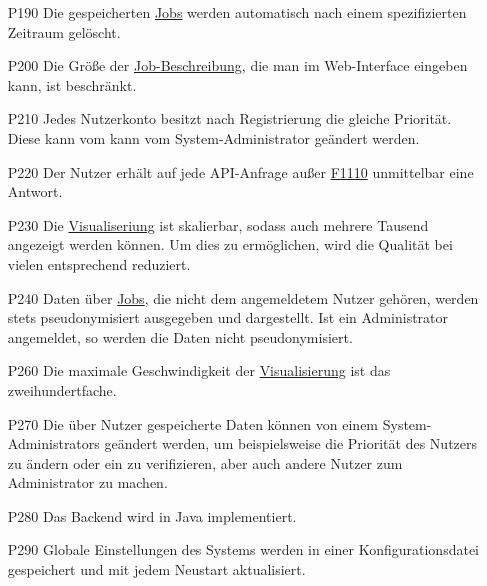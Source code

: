 \begin{itemize}[noitemsep]
    \item[P190] Die gespeicherten \hyperref[B:Jobs]{Jobs} werden automatisch nach einem spezifizierten Zeitraum gelöscht.

    \item[P200] Die Größe der \hyperref[B:Job-Beschreibung]{Job-Beschreibung}, die man im \gls{Web-Interface} eingeben kann, ist beschränkt.

    
    \item[P210] Jedes \gls{Nutzerkonto} besitzt nach Registrierung die gleiche Priorität. Diese kann vom kann vom \gls{System-Administrator} geändert werden.
    
    
    \item[P220] Der \gls{Nutzer} erhält auf jede \gls{API}-Anfrage außer \hyperref[FA:API:Andauernde Abfrage des Ergebnisses eines Jobs]{F1110} unmittelbar eine  Antwort.
    
    \item[P230] Die \hyperref[pages:visualization]{Visualiseriung} ist skalierbar, sodass auch mehrere Tausend  angezeigt werden können. Um dies zu ermöglichen, wird die Qualität bei vielen  entsprechend reduziert.%
    
    \item[P240] Daten über \hyperref[B:Jobs]{Jobs}, die nicht dem angemeldetem \gls{Nutzer} gehören, werden stets pseudonymisiert ausgegeben und dargestellt. Ist ein \gls{Administrator} angemeldet, so werden die Daten nicht pseudonymisiert.
    
    
    \item[P260] Die maximale Geschwindigkeit der \hyperref[pages:visualization]{Visualisierung} ist das zweihundertfache.
    
    \item[P270] Die über \gls{Nutzer} gespeicherte Daten können von einem \glspl{System-Administrator} geändert werden, um beispielsweise die Priorität des \gls{Nutzer}s zu ändern oder ein  zu verifizieren, aber auch andere \gls{Nutzer} zum \gls{Administrator} zu machen.
    
    \item[P280] Das Backend wird in Java implementiert.

    \item[P290] Globale Einstellungen des Systems werden in einer \gls{Konfigurationsdatei} gespeichert und mit jedem Neustart aktualisiert.

\end{itemize}